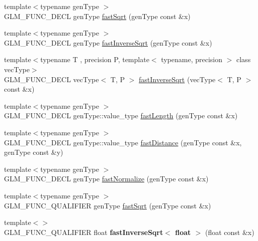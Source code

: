 \begin{DoxyCompactItemize}
\item 
{\footnotesize template$<$typename gen\+Type $>$ }\\G\+L\+M\+\_\+\+F\+U\+N\+C\+\_\+\+D\+E\+CL gen\+Type \hyperlink{group__gtx__fast__square__root_gab07ddede2731f3438d687a652c843673}{fast\+Sqrt} (gen\+Type const \&x)
\item 
{\footnotesize template$<$typename gen\+Type $>$ }\\G\+L\+M\+\_\+\+F\+U\+N\+C\+\_\+\+D\+E\+CL gen\+Type \hyperlink{group__gtx__fast__square__root_ga65237d716748c6262f316ec1eaf7f073}{fast\+Inverse\+Sqrt} (gen\+Type const \&x)
\item 
{\footnotesize template$<$typename T , precision P, template$<$ typename, precision $>$ class vec\+Type$>$ }\\G\+L\+M\+\_\+\+F\+U\+N\+C\+\_\+\+D\+E\+CL vec\+Type$<$ T, P $>$ \hyperlink{group__gtx__fast__square__root_ga903878071f92e51e551791e584a171a1}{fast\+Inverse\+Sqrt} (vec\+Type$<$ T, P $>$ const \&x)
\item 
{\footnotesize template$<$typename gen\+Type $>$ }\\G\+L\+M\+\_\+\+F\+U\+N\+C\+\_\+\+D\+E\+CL gen\+Type\+::value\+\_\+type \hyperlink{group__gtx__fast__square__root_ga70aa3c80d8bb22e021c6c3ebdcf8e3ee}{fast\+Length} (gen\+Type const \&x)
\item 
{\footnotesize template$<$typename gen\+Type $>$ }\\G\+L\+M\+\_\+\+F\+U\+N\+C\+\_\+\+D\+E\+CL gen\+Type\+::value\+\_\+type \hyperlink{group__gtx__fast__square__root_ga69778792fcadc29f586efa3ec2118cdc}{fast\+Distance} (gen\+Type const \&x, gen\+Type const \&y)
\item 
{\footnotesize template$<$typename gen\+Type $>$ }\\G\+L\+M\+\_\+\+F\+U\+N\+C\+\_\+\+D\+E\+CL gen\+Type \hyperlink{group__gtx__fast__square__root_ga3b02c1d6e0c754144e2f1e110bf9f16c}{fast\+Normalize} (gen\+Type const \&x)
\item 
{\footnotesize template$<$typename gen\+Type $>$ }\\G\+L\+M\+\_\+\+F\+U\+N\+C\+\_\+\+Q\+U\+A\+L\+I\+F\+I\+ER gen\+Type \hyperlink{group__gtx__fast__square__root_gab07ddede2731f3438d687a652c843673}{fast\+Sqrt} (gen\+Type const \&x)
\item 
{\footnotesize template$<$$>$ }\\G\+L\+M\+\_\+\+F\+U\+N\+C\+\_\+\+Q\+U\+A\+L\+I\+F\+I\+ER float {\bfseries fast\+Inverse\+Sqrt$<$ float $>$} (float const \&x)\hypertarget{namespaceglm_a3c4d65bdc005cd73dd36a5bccbda7404}{}\label{namespaceglm_a3c4d65bdc005cd73dd36a5bccbda7404}


\end{DoxyCompactItemize}
